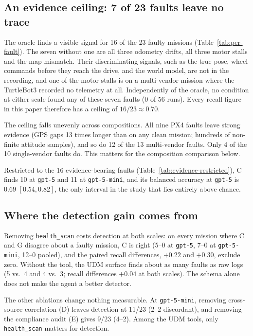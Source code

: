 \documentclass[conference]{IEEEtran}
\newcommand{\condC}{C}
\newcommand{\condG}{G}
\newcommand{\hs}{\texttt{health\_scan}}
\begin{document}
\subsection{An evidence ceiling: 7 of 23 faults leave no trace}
\label{sec:evidence}


The oracle finds a visible signal for 16 of the 23 faulty missions
(Table~\ref{tab:per-fault}). The seven without one are all three odometry drifts,
all three motor stalls and the map mismatch. Their discriminating signals, such as
the true pose, wheel commands before they reach the drive, and the world model, are
not in the recording, and one of the motor stalls is on a multi-vendor mission where
the TurtleBot3 recorded no telemetry at all. Independently of the oracle, no
condition at either scale found any of these seven faults (0 of 56 runs). Every
recall figure in this paper therefore has a ceiling of $16/23 \approx 0.70$.

The ceiling falls unevenly across compositions. All nine PX4 faults leave strong
evidence (GPS gaps 13 times longer than on any clean mission; hundreds of
non-finite attitude samples), and so do 12 of the 13 multi-vendor faults. Only 4 of
the 10 single-vendor faults do. This matters for the composition comparison below.



Restricted to the 16 evidence-bearing faults (Table~\ref{tab:evidence-restricted}),
\condC{} finds 10 at \texttt{gpt-5} and 11 at \texttt{gpt-5-mini}, and its
balanced accuracy at \texttt{gpt-5} is $0.69$ $[0.54, 0.82]$, the only interval in
the study that lies entirely above chance.

\subsection{Where the detection gain comes from}
Removing \hs{} costs detection at both scales: on every mission where \condC{} and
\condG{} disagree about a faulty mission, \condC{} is right (5--0 at \texttt{gpt-5},
7--0 at \texttt{gpt-5-mini}, 12--0 pooled), and the paired recall differences,
$+0.22$ and $+0.30$, exclude zero. Without the tool, the UDM surface finds about as
many faults as raw logs (5 vs.\ 4 and 4 vs.\ 3; recall differences $+0.04$ at both
scales). The schema alone does not make the agent a better detector.

The other ablations change nothing measurable. At \texttt{gpt-5-mini}, removing
cross-source correlation (D) leaves detection at 11/23 (2--2 discordant), and
removing the compliance audit (E) gives 9/23 (4--2). Among the UDM tools, only
\hs{} matters for detection.
\end{document}
